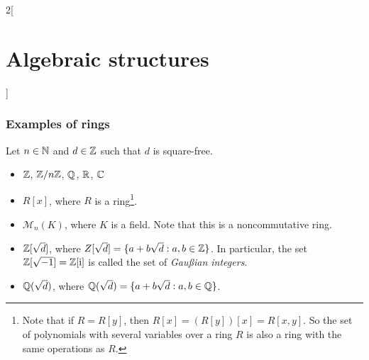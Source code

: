 \documentclass[../../../main.tex]{subfiles}
\begin{document}
\begin{multicols}{2}[\section{Algebraic structures}]
\subsubsection{Examples of rings}\label{AS-examples2}
Let $n\in\mathbb{N}$ and $d\in\mathbb{Z}$ such that $d$ is square-free.
\begin{itemize}
    \item $\mathbb{Z}$, $\mathbb{Z}/n\mathbb{Z}$, $\mathbb{Q}$, $\mathbb{R}$, $\mathbb{C}$
    \item $R[x]$, where $R$ is a ring\footnote{Note that if $R=R[y]$, then $R[x]=(R[y])[x]=R[x,y]$. So the set of polynomials with several variables over a ring $R$ is also a ring with the same operations as $R$.}.
    \item $\mathcal{M}_n(K)$, where $K$ is a field. Note that this is a noncommutative ring.
    \item $\mathbb{Z}[\sqrt{d}]$, where $Z[\sqrt{d}]=\{a+b\sqrt{d}:a,b\in\mathbb{Z}\}$. In particular, the set $\mathbb{Z}[\sqrt{-1}]=\mathbb{Z}[\mathrm{i}]$ is called the set of \textit{Gau\ss ian integers}.
    \item $\mathbb{Q}(\sqrt{d})$, where $\mathbb{Q}(\sqrt{d})=\{a+b\sqrt{d}:a,b\in\mathbb{Q}\}$.
\end{itemize}
\end{multicols}
\end{document}
